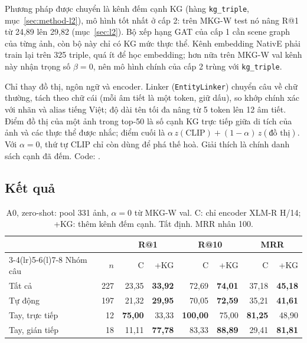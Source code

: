 Phương pháp được chuyển là kênh đếm cạnh KG (hàng \texttt{kg\_triple}, mục~\ref{sec:method-l2}), mô hình tốt
nhất ở cấp 2: trên MKG-W test nó nâng R@1 từ 24,89 lên 29,82 (mục~\ref{sec:l2}). Bộ xếp hạng GAT của cấp 1 cần
scene graph của từng ảnh, còn bộ này chỉ có KG mức thực thể. Kênh embedding NativE phải train lại trên 325
triple, quá ít để học embedding; hơn nữa trên MKG-W val kênh này nhận trọng số $\beta=0$, nên mô hình chính của
cấp 2 trùng với \texttt{kg\_triple}.

Chỉ thay đồ thị, ngôn ngữ và encoder. Linker (\texttt{EntityLinker}) chuyển câu về chữ thường, tách theo chữ cái
(mỗi âm tiết là một token, giữ dấu), so khớp chính xác với nhãn và alias tiếng Việt; độ dài tên tối đa nâng từ 5
token lên 12 âm tiết. Điểm đồ thị của một ảnh trong top-50 là số cạnh KG trực tiếp giữa di tích của ảnh và các
thực thể được nhắc; điểm cuối là $\alpha\, z(\mathrm{CLIP}) + (1-\alpha)\, z(\text{đồ thị})$. Với $\alpha=0$,
thứ tự CLIP chỉ còn dùng để phá thế hoà. Giải thích là chính danh sách cạnh đã đếm. Code:
.

\subsection{Kết quả}\label{sec:vn-results}

\begin{table}[t]
\centering
\caption{A0, zero-shot: pool 331 ảnh, $\alpha=0$ từ MKG-W val. C: chỉ encoder XLM-R H/14; +KG: thêm kênh đếm
cạnh. Tất định. MRR nhân 100.}
\label{tab:vn-a0}
\footnotesize
\setlength{\tabcolsep}{2.5pt}
\begin{tabular}{@{}lrrrrrrr@{}}
\toprule
 & & \multicolumn{2}{c}{R@1} & \multicolumn{2}{c}{R@10} & \multicolumn{2}{c}{MRR} \\
\cmidrule(lr){3-4}\cmidrule(lr){5-6}\cmidrule(l){7-8}
Nhóm câu & $n$ & C & +KG & C & +KG & C & +KG \\
\midrule
Tất cả & 227 & 23,35 & \textbf{33,92} & 72,69 & \textbf{74,01} & 37,18 & \textbf{45,18} \\
Tự động & 197 & 21,32 & \textbf{29,95} & 70,05 & \textbf{72,59} & 35,21 & \textbf{41,61} \\
Tay, trực tiếp & 12 & \textbf{75,00} & 33,33 & \textbf{100,00} & 75,00 & \textbf{81,25} & 48,90 \\
Tay, gián tiếp & 18 & 11,11 & \textbf{77,78} & 83,33 & \textbf{88,89} & 29,41 & \textbf{81,81} \\
\bottomrule
\end{tabular}
\end{table}

